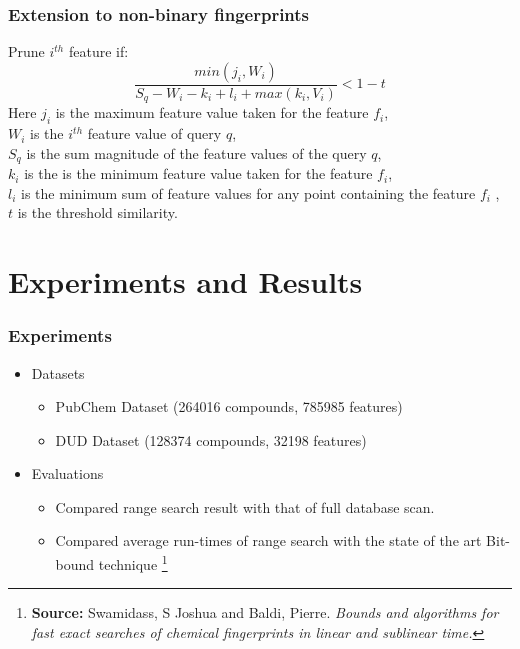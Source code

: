 \documentclass{beamer}
\begin{document}
\begin{frame}
\frametitle{Extension to non-binary fingerprints}
Prune $i^{th}$ feature if:
\begin{equation}
\label{eq:boun3}
\frac{min(j_i,W_i)}{S_q - W_i -k_i+ l_i + max (k_i, V_i)}  < 1-t
\end{equation}
Here $j_i$ is the maximum feature value taken for the feature $f_i$,\\  $W_i$ is the $i^{th}$ feature value of query $q$,  \\$S_q$ is the sum magnitude of the feature values of the query $q$, \\ $k_i$ is the is the minimum feature value taken for the feature $f_i$,\\  $l_i$ is the minimum sum of feature values for any point containing the feature $f_i$ , \\ $t$ is the threshold similarity.
\end{frame}

\section{Experiments and Results}
\begin{frame}
\frametitle{Experiments}
\begin{itemize}
\item<1-> Datasets
\begin{itemize}
	\item PubChem Dataset (264016 compounds, 785985 features)
	\item DUD Dataset (128374 compounds, 32198 features)
\end{itemize}

\item<1-> Evaluations
\begin{itemize}
	\item Compared range search result with that of full database scan.
	\item Compared average run-times of range search with the state of the art Bit-bound technique 
\footnote{\textbf{Source:} Swamidass, S Joshua and Baldi, Pierre. \textit{Bounds and algorithms for fast exact searches of chemical fingerprints in linear and sublinear time.}} 
\end{itemize} 
\end{itemize}

\end{frame}
\end{document}

